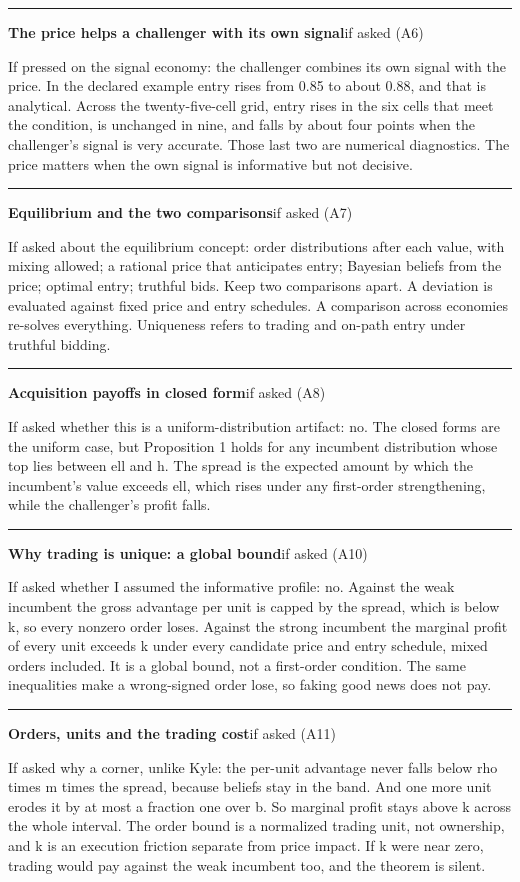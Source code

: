 \documentclass[11pt]{article}
\newcommand{\scriptframe}[3]{%
  \Needspace{9\baselineskip}%
  \par\medskip\noindent\textcolor{ScriptBlue}{\rule{\linewidth}{0.55pt}}%
  \par\smallskip\noindent
  \textbf{#1}\hfill\textcolor{ScriptGray}{\small #2}\par\smallskip
  #3\par}
\begin{document}
\scriptframe{The price helps a challenger with its own signal}{if asked (A6)}{%
  If pressed on the signal economy: the challenger combines its own signal with
  the price. In the declared example entry rises from 0.85 to about 0.88, and
  that is analytical.
  Across the twenty-five-cell grid, entry rises in the six cells that meet the
  condition, is unchanged in nine, and falls by about four points when the
  challenger's signal is very accurate. Those last two are numerical
  diagnostics. The price matters when the own signal is informative but not
  decisive.
}

\scriptframe{Equilibrium and the two comparisons}{if asked (A7)}{%
  If asked about the equilibrium concept: order distributions after each value,
  with mixing allowed; a rational price that anticipates entry; Bayesian beliefs
  from the price; optimal entry; truthful bids. Keep two comparisons apart. A
  deviation is evaluated against fixed price and entry schedules. A comparison
  across economies re-solves everything. Uniqueness refers to trading and
  on-path entry under truthful bidding.
}

\scriptframe{Acquisition payoffs in closed form}{if asked (A8)}{%
  If asked whether this is a uniform-distribution artifact: no. The closed forms
  are the uniform case, but Proposition 1 holds for any incumbent distribution
  whose top lies between ell and h. The spread is the expected amount by which
  the incumbent's value exceeds ell, which rises under any first-order
  strengthening, while the challenger's profit falls.
}

\scriptframe{Why trading is unique: a global bound}{if asked (A10)}{%
  If asked whether I assumed the informative profile: no. Against the weak
  incumbent the gross advantage per unit is capped by the spread, which is below
  k, so every nonzero order loses. Against the strong incumbent the marginal
  profit of every unit exceeds k under every candidate price and entry schedule,
  mixed orders included. It is a global bound, not a first-order condition. The
  same inequalities make a wrong-signed order lose, so faking good news does not
  pay.
}

\scriptframe{Orders, units and the trading cost}{if asked (A11)}{%
  If asked why a corner, unlike Kyle: the per-unit advantage never falls below
  rho times m times the spread, because beliefs stay in the band. And one more
  unit erodes it by at most a fraction one over b. So marginal profit stays above
  k across the whole interval. The order bound is a normalized trading unit, not
  ownership, and k is an execution friction separate from price impact. If k
  were near zero, trading would pay against the weak incumbent too, and the
  theorem is silent.
}
\end{document}
